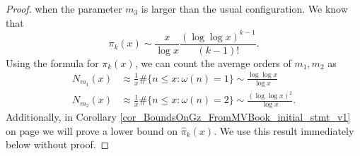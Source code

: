 \documentclass[11pt,reqno,a4letter]{article}
\numberwithin{figure}{section}
\numberwithin{table}{section}
\theoremstyle{plain}
\numberwithin{theorem}{section}
\theoremstyle{definition}
\begin{document}
\begin{proof}
when the parameter $m_3$ is larger than the usual configuration. 
We know that 
\[
\pi_k(x) \sim \frac{x}{\log x} \frac{(\log\log x)^{k-1}}{(k-1)!}. 
\]
Using the formula for $\pi_k(x)$, we can count the average orders of $m_1,m_2$ as 
\begin{align*}
N_{m_1}(x) & \approx \frac{1}{x} \#\{n \leq x: \omega(n) = 1\} \sim \frac{\log\log x}{\log x} \\ 
N_{m_2}(x) & \approx \frac{1}{x} \#\{n \leq x: \omega(n) = 2\} \sim \frac{(\log\log x)^2}{\log x}. 
\end{align*} 
Additionally, in Corollary \ref{cor_BoundsOnGz_FromMVBook_initial_stmt_v1} on 
page \pageref{cor_BoundsOnGz_FromMVBook_initial_stmt_v1} 
we will prove a lower bound on $\widehat{\pi}_k(x)$. We use this result immediately 
below without proof. 


\end{proof}
\end{document}
